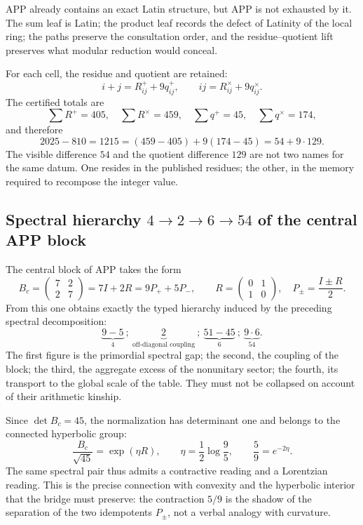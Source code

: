 \begin{resultbox}
APP already contains an exact Latin structure, but APP is not exhausted by it.
The sum leaf is Latin; the product leaf records the defect of Latinity of the
local ring; the paths preserve the consultation order, and the
residue--quotient lift preserves what modular reduction would conceal.
\end{resultbox}

For each cell, the residue and quotient are retained:
\[
 i+j=R^+_{ij}+9q^+_{ij},
 \qquad
 ij=R^\times_{ij}+9q^\times_{ij}.
 \tag{GMC-2.2}
\]
The certified totals are
\[
 \sum R^+=405,
 \quad \sum R^\times=459,
 \quad \sum q^+=45,
 \quad \sum q^\times=174,
\]
and therefore
\[
 2025-810=1215=(459-405)+9(174-45)=54+9\cdot129.
 \tag{GMC-2.3}
\]
The visible difference $54$ and the quotient difference $129$ are not two
names for the same datum. One resides in the published residues; the other, in
the memory required to recompose the integer value.

\subsection{Spectral hierarchy \(4\to2\to6\to54\) of the central APP block}

The central block of APP takes the form
\[
 B_c=\begin{pmatrix}7&2\\2&7\end{pmatrix}
     =7I+2R
     =9P_++5P_-,
 \qquad
 R=\begin{pmatrix}0&1\\1&0\end{pmatrix},
 \quad P_\pm=\frac{I\pm R}{2}.
 \tag{GMC-2.4}
\]
From this one obtains exactly the typed hierarchy induced by the
preceding spectral decomposition:
\[
 \underbrace{9-5}_{4}
 \ ;\ 
 \underbrace{2}_{\text{off-diagonal coupling}}
 \ ;\ 
 \underbrace{51-45}_{6}
 \ ;\ 
 \underbrace{9\cdot6}_{54}.
 \tag{GMC-2.5}
\]
The first figure is the primordial spectral gap; the second, the coupling
of the block; the third, the aggregate excess of the nonunitary sector; the fourth,
its transport to the global scale of the table. They must not be collapsed on account of their
arithmetic kinship.

Since $\det B_c=45$, the normalization has determinant one and belongs to the
connected hyperbolic group:
\[
 \frac{B_c}{\sqrt{45}}
 =\exp(\eta R),
 \qquad
 \eta=\frac12\log\frac95,
 \qquad
 \frac59=e^{-2\eta}.
 \tag{GMC-2.6}
\]
The same spectral pair thus admits a contractive reading and a
Lorentzian reading. This is the precise connection with convexity and the
hyperbolic interior that the bridge must preserve: the contraction $5/9$ is the shadow
of the separation of the two idempotents $P_\pm$, not a verbal analogy with
curvature.

